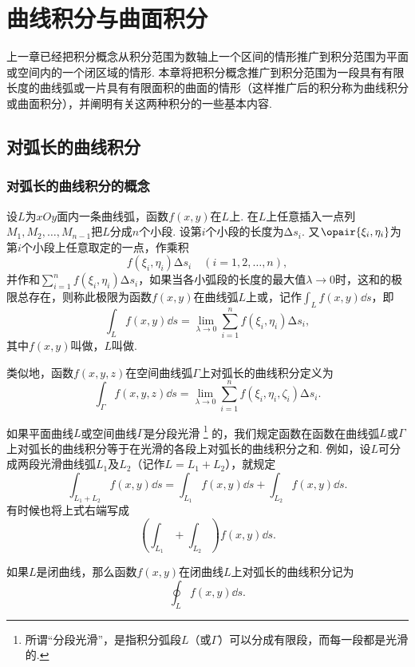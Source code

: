 \chapter{曲线积分与曲面积分}
上一章已经把积分概念从积分范围为数轴上一个区间的情形推广到积分范围为平面或空间内的一个闭区域的情形.
本章将把积分概念推广到积分范围为一段具有有限长度的曲线弧或一片具有有限面积的曲面的情形（这样推广后的积分称为曲线积分或曲面积分），并阐明有关这两种积分的一些基本内容.

\section{对弧长的曲线积分}
\subsection{对弧长的曲线积分的概念}
\begin{definition}
设\(L\)为\(xOy\)面内一条曲线弧，函数\(f(x,y)\)在\(L\)上.
在\(L\)上任意插入一点列\(M_1,M_2,\dotsc,M_{n-1}\)把\(L\)分成\(n\)个小段.
设第\(i\)个小段的长度为\(\increment s_i\).
又\(\opair{\xi_i,\eta_i}\)为第\(i\)个小段上任意取定的一点，作乘积\[
f(\xi_i,\eta_i) \increment s_i \quad(i=1,2,\dotsc,n),
\]并作和\(\sum\limits_{i=1}^n f(\xi_i,\eta_i) \increment s_i\)，如果当各小弧段的长度的最大值\(\lambda\to0\)时，这和的极限总存在，则称此极限为函数\(f(x,y)\)在曲线弧\(L\)上或，记作\(\int_L f(x,y) \dd{s}\)，即\[
\int_L f(x,y) \dd{s}
= \lim\limits_{\lambda\to0} \sum\limits_{i=1}^n f(\xi_i,\eta_i) \increment s_i,
\]其中\(f(x,y)\)叫做，\(L\)叫做.

类似地，函数\(f(x,y,z)\)在空间曲线弧\(\Gamma\)上对弧长的曲线积分定义为\[
\int_{\Gamma} f(x,y,z) \dd{s}
=\lim\limits_{\lambda\to0} \sum\limits_{i=1}^n f(\xi_i,\eta_i,\zeta_i) \increment s_i.
\]

如果平面曲线\(L\)或空间曲线\(\Gamma\)是分段光滑%
\footnote{%
所谓“分段光滑”，是指积分弧段\(L\)（或\(\Gamma\)）可以分成有限段，而每一段都是光滑的.%
}%
的，我们规定函数在函数在曲线弧\(L\)或\(\Gamma\)上对弧长的曲线积分等于在光滑的各段上对弧长的曲线积分之和.
例如，设\(L\)可分成两段光滑曲线弧\(L_1\)及\(L_2\)（记作\(L=L_1+L_2\)），就规定
\[
\int_{L_1+L_2} f(x,y) \dd{s}
= \int_{L_1} f(x,y) \dd{s}
+ \int_{L_2} f(x,y) \dd{s}.
\]
有时候也将上式右端写成\[
\left( \int_{L_1} + \int_{L_2} \right) f(x,y) \dd{s}.
\]

如果\(L\)是闭曲线，那么函数\(f(x,y)\)在闭曲线\(L\)上对弧长的曲线积分记为\[
\oint_L f(x,y) \dd{s}.
\]
\end{definition}

